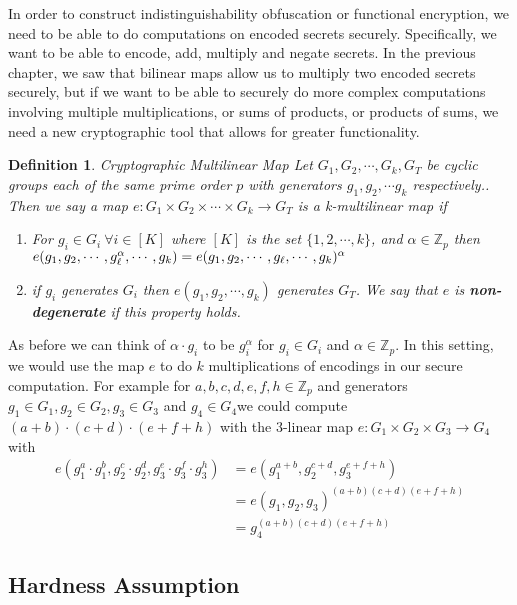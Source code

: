 \documentclass[12pt,twoside]{reedthesis}
\newtheorem{definition}{Definition}
\newcommand{\Z}[0]{\mathbb{Z}}
\begin{document}
    In order to construct indistinguishability obfuscation or functional encryption, we need to be able to do computations on encoded secrets securely. Specifically, we want to be able to encode, add, multiply and negate secrets. In the previous chapter, we saw that bilinear maps allow us to multiply two encoded secrets securely, but if we want to be able to securely do more complex computations involving multiple multiplications, or sums of products, or products of sums, we need a new cryptographic tool that allows for greater functionality.
    \begin{definition}{Cryptographic Multilinear Map}
    Let $G_1,G_2, \cdots, G_k,G_T$ be cyclic groups each of the same prime order $p$ with generators $g_1,g_2,\cdots g_k$ respectively.. Then we say a map $e:G_1 \times G_2 \times \cdots \times G_k \rightarrow G_T$ is a k-multilinear map if
    
    \begin{enumerate}
    \item For $g_i \in G_i \: \forall i \in [K]$ where $[K]$ is the set $\{1,2,\cdots,k \}$, and $\alpha \in \mathbb{Z}_p$ then $e(g_1, g_2, \cdots,g_\ell^\alpha , \cdots , g_k) =e(g_1, g_2, \cdots, g_\ell , \cdots , g_k)^\alpha \\$
    \item if $g_i$ generates $G_i$ then $e(g_1,g_2,\cdots , g_k)$ generates $G_T$. We say that $e$ is \textbf{non-degenerate} if this property holds.
    \end{enumerate}
    \end{definition}
       
       As before we can think of $\alpha \cdot g_i$ to be $g_i^\alpha$ for $g_i \in G_i$ and $\alpha \in \Z_p$. In this setting, we would use the map $e$ to do $k$ multiplications of encodings in our secure computation. For example for $a,b,c,d,e,f,h \in \Z_p$ and generators $g_1 \in G_1, g_2\in G_2, g_3\in G_3$ and $g_4 \in G_4$we could compute $(a+b)\cdot(c+d)\cdot(e+f+h)$ with the $3$-linear map $e:G_1\times G_2 \times G_3 \to G_4$ with 
 \begin{align*}      
 e(g_1^a \cdot g_1^b,g_2^c\cdot g_2^d,g_3^e\cdot g_3^f \cdot g_3^h)&=e(g_1^{a +b},g_2^{c+d},g_3^{e+f+h})\\
 &= e(g_1,g_2,g_3)^{(a+b)(c+d)(e+f+h)} \\
 &=g_4^{(a+b)(c+d)(e+f+h)}
 \end{align*}
 
 \subsection{Hardness Assumption}
 
\end{document}
